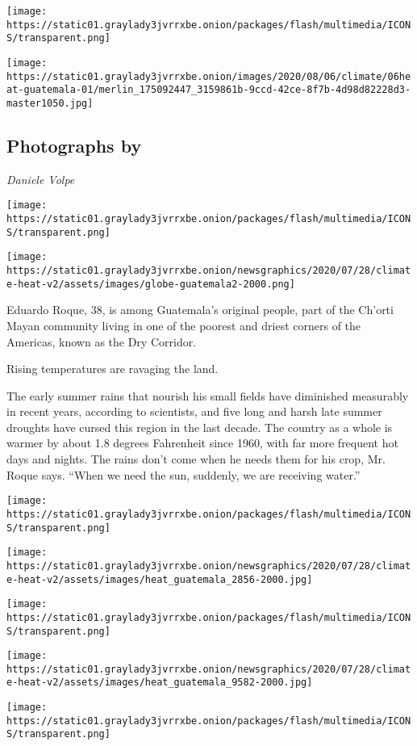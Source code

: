 \texttt{[image: https://static01.graylady3jvrrxbe.onion/packages/flash/multimedia/ICONS/transparent.png]}

\texttt{[image: https://static01.graylady3jvrrxbe.onion/images/2020/08/06/climate/06heat-guatemala-01/merlin\_175092447\_3159861b-9ccd-42ce-8f7b-4d98d82228d3-master1050.jpg]}

\hypertarget{photographs-by-3}{%
\subsection{Photographs by}\label{photographs-by-3}}

\emph{Daniele Volpe}

\texttt{[image: https://static01.graylady3jvrrxbe.onion/packages/flash/multimedia/ICONS/transparent.png]}

\texttt{[image: https://static01.graylady3jvrrxbe.onion/newsgraphics/2020/07/28/climate-heat-v2/assets/images/globe-guatemala2-2000.png]}

Eduardo Roque, 38, is among Guatemala's original people, part of the
Ch'orti Mayan community living in one of the poorest and driest corners
of the Americas, known as the Dry Corridor.

Rising temperatures are ravaging the land.

The early summer rains that nourish his small fields have diminished
measurably in recent years, according to scientists, and five long and
harsh late summer droughts have cursed this region in the last decade.
The country as a whole is warmer by about 1.8 degrees Fahrenheit since
1960, with far more frequent hot days and nights. The rains don't come
when he needs them for his crop, Mr. Roque says. ``When we need the sun,
suddenly, we are receiving water.''

\texttt{[image: https://static01.graylady3jvrrxbe.onion/packages/flash/multimedia/ICONS/transparent.png]}

\texttt{[image: https://static01.graylady3jvrrxbe.onion/newsgraphics/2020/07/28/climate-heat-v2/assets/images/heat\_guatemala\_2856-2000.jpg]}

\texttt{[image: https://static01.graylady3jvrrxbe.onion/packages/flash/multimedia/ICONS/transparent.png]}

\texttt{[image: https://static01.graylady3jvrrxbe.onion/newsgraphics/2020/07/28/climate-heat-v2/assets/images/heat\_guatemala\_9582-2000.jpg]}

\texttt{[image: https://static01.graylady3jvrrxbe.onion/packages/flash/multimedia/ICONS/transparent.png]}

